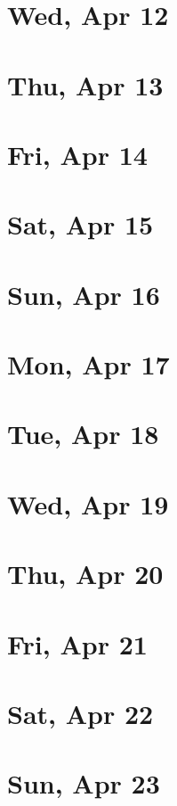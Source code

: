 	\section{Wed, Apr 12}
		
	\section{Thu, Apr 13}
		
	\section{Fri, Apr 14}
		
	\section{Sat, Apr 15}
		
	\section{Sun, Apr 16}
		
	\section{Mon, Apr 17}
		
	\section{Tue, Apr 18}
		
	\section{Wed, Apr 19}
		
	\section{Thu, Apr 20}
		
	\section{Fri, Apr 21}
		
	\section{Sat, Apr 22}
		
	\section{Sun, Apr 23}
		
